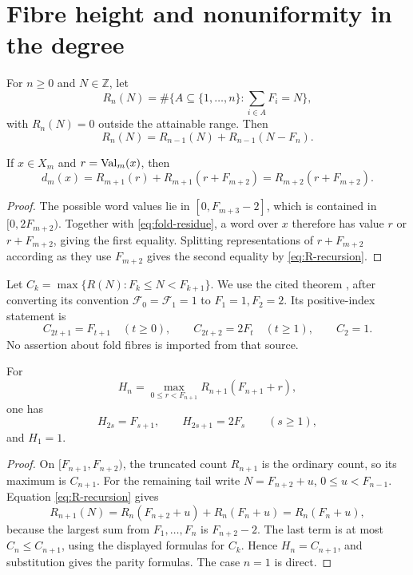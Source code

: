 \section{Fibre height and nonuniformity in the degree}
\label{sec:height}

For \(n\ge0\) and \(N\in\mathbb Z\), let
\[
 R_n(N)=\#\{A\subseteq\{1,\ldots,n\}:\sum_{i\in A}F_i=N\},
\]
with \(R_n(N)=0\) outside the attainable range.  Then
\begin{equation}\label{eq:R-recursion}
 R_n(N)=R_{n-1}(N)+R_{n-1}(N-F_n).
\end{equation}

\begin{lemma}
\label{lem:fold-fibre-representation-pairing}
If \(x\in X_m\) and \(r=\operatorname{Val}_m(x)\), then
\[
 d_m(x)=R_{m+1}(r)+R_{m+1}(r+F_{m+2})
       =R_{m+2}(r+F_{m+2}).
\]
\end{lemma}
\begin{proof}
The possible word values lie in
\([0,F_{m+3}-2]\), which is contained in \([0,2F_{m+2})\).
Together with \eqref{eq:fold-residue}, a word over \(x\) therefore has value
\(r\) or \(r+F_{m+2}\), giving the first equality.  Splitting
representations of \(r+F_{m+2}\) according as they use \(F_{m+2}\) gives
the second equality by \eqref{eq:R-recursion}.
\end{proof}

\begin{lemma}
\label{lem:ordinary-interval-maximum-input}
Let
\(C_k=\max\{R(N):F_k\le N<F_{k+1}\}\).  We use the cited theorem
\cite[Thm.~4.7]{KocabovaMasakovaPelantova2005}, after converting its convention
\(\mathcal F_0=\mathcal F_1=1\) to \(F_1=1,F_2=2\).  Its positive-index
statement is
\[
 C_{2t+1}=F_{t+1}\quad(t\ge0),\qquad
 C_{2t+2}=2F_t\quad(t\ge1),\qquad C_2=1.
\]
No assertion about fold fibres is imported from that source.
\end{lemma}

\begin{lemma}
\label{thm:half-interval-fibonacci-representation-max}
For
\[
 H_n=\max_{0\le r<F_{n+1}}R_{n+1}(F_{n+1}+r),
\]
one has
\[
 H_{2s}=F_{s+1},\qquad H_{2s+1}=2F_s\qquad(s\ge1),
\]
and \(H_1=1\).
\end{lemma}
\begin{proof}
On \([F_{n+1},F_{n+2})\), the truncated count \(R_{n+1}\) is the ordinary
count, so its maximum is \(C_{n+1}\).  For the remaining tail write
\(N=F_{n+2}+u\), \(0\le u<F_{n-1}\).  Equation \eqref{eq:R-recursion} gives
\[
 R_{n+1}(N)=R_n(F_{n+2}+u)+R_n(F_n+u)=R_n(F_n+u),
\]
because the largest sum from \(F_1,\ldots,F_n\) is \(F_{n+2}-2\).
The last term is at most \(C_n\le C_{n+1}\), using the displayed formulas for
\(C_k\).  Hence \(H_n=C_{n+1}\), and substitution gives the parity formulas.
The case \(n=1\) is direct.
\end{proof}

